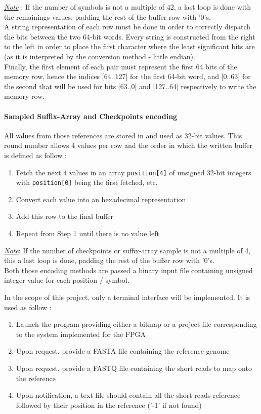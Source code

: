 \textit{\underline{Note}} : If the number of symbols is not a multiple of 42, a last loop is done with the remainings values, padding the rest of the buffer row with '0's. \\



A string representation of each row must be done in order to correctly dispatch the bits between the two 64-bit words. Every string is constructed from the right to the left in order to place the first character where the least significant bits are (as it is interpreted by the conversion method - little endian). \\
Finally, the first element of each pair must represent the first 64 bits of the memory row, hence the indices [64..127] for the first 64-bit word, and [0..63] for the second that will be used for bits [63..0] and [127..64] respectively to write the memory row.

\paragraph{Sampled Suffix-Array and Checkpoints encoding}

All values from those references are stored in and used as 32-bit values. This round number allows 4 values per row and the order in which the written buffer is defined as follow :
\begin{enumerate}
    \item Fetch the next 4 values in an array \texttt{position[4]} of unsigned 32-bit integers with \texttt{position[0]} being the first fetched, etc.
    \item Convert each value into an hexadecimal representation
    \item Add this row to the final buffer
    \item Repeat from Step 1 until there is no value left
\end{enumerate}

\textit{\underline{Note}}: If the number of checkpoints or suffix-array sample is not a multiple of 4, this a last loop is done, padding the rest of the buffer row with '0's. \\

Both those encoding methods are passed a binary input file containing unsigned integer value for each position / symbol.

In the scope of this project, only a terminal interface will be implemented. It is used as follow :
\begin{enumerate}
    \item Launch the program providing either a bitmap or a project file corresponding to the system implemented for the FPGA
    \item Upon request, provide a FASTA file containing the reference genome
    \item Upon request, provide a FASTQ file containing the short reads to map onto the reference
    \item Upon notification, a text file should contain all the short reads reference followed by their position in the reference ('-1' if not found)
\end{enumerate}

